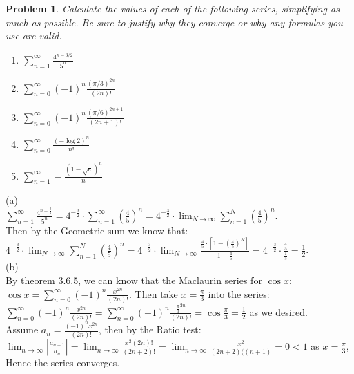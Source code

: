\documentclass[12pt,reqno]{amsart}
\newtheorem{problem}{Problem}
\begin{document}
\medskip
\begin{problem}
Calculate the values of each of the following series, simplifying as much as possible. Be sure to justify why they converge or why any formulas you use are valid.
\begin{enumerate}
\item $\displaystyle\sum_{n=1}^\infty \frac{4^{n-3/2}}{5^n}$
\item $\displaystyle\sum_{n=0}^\infty (-1)^n \frac{(\pi/3)^{2n}}{(2n)!}$
\item $\displaystyle\sum_{n=0}^\infty (-1)^n \frac{(\pi/6)^{2n+1}}{(2n+1)!}$
\item $\displaystyle\sum_{n=0}^\infty \frac{(-\log 2)^n}{n!}$
\item $\displaystyle\sum_{n=1}^\infty -\frac{(1-\sqrt e)^n}n$
\end{enumerate}
\end{problem}
(a)\\
$\displaystyle\sum_{n=1}^{\infty} \frac{4^{n-\frac{3}{2}}}{5^n}=4^{-\frac{3}{2}} \cdot \sum_{n=1}^{\infty}(\frac{4}{5})^n=4^{-\frac{3}{2}} \cdot \lim _{N \rightarrow \infty} \sum_{n=1}^N(\frac{4}{5})^n.$
\\Then by the Geometric sum we know that:\\
$\displaystyle4^{-\frac{3}{2}} \cdot \lim _{N \rightarrow \infty} \sum_{n=1}^N(\frac{4}{5})^n=4^{-\frac{3}{2}} \cdot \lim _{N \rightarrow \infty} \frac{\frac{4}{5} \cdot\left[1-(\frac{4}{5})^N\right]}{1-\frac{4}{5}}= 4^{-\frac{3}{2}} \cdot \frac{\frac{4}{5}}{\frac{1}{5}}=\frac{1}{2}$.\\
(b)
\\By theorem 3.6.5, we can know that the Maclaurin series for $\cos x$:
\\$\cos x=\sum_{n=0}^{\infty}(-1)^n \frac{x^{2 n}}{(2 n) !}$.
Then take $x=\frac{\pi}{3}$ into the series:
\\$\sum_{n=0}^{\infty}(-1)^n \frac{x^{2 n}}{(2 n) !}=\sum_{n=0}^{\infty}(-1)^n \frac{\frac{\pi}{3}^{2 n}}{(2 n) !}=\cos\frac{\pi}{3}=\frac{1}{2}$ as we desired.
\\Assume $a_n=\frac{(-1)^nx^{2n}}{(2 n) !}$, then by the Ratio test:\\
$\lim _{n \rightarrow \infty}\left|\frac{a_{n+1}}{a_n}\right|=\lim _{n \rightarrow \infty} \frac{x^2(2 n) !}{(2 n+2) !}=\lim _{n \rightarrow \infty} \frac{x^2}{(2 n+2)((n+1)}=0<1$ as $x=\frac{\pi}{3}$, \\Hence the series converges.
\end{document}
